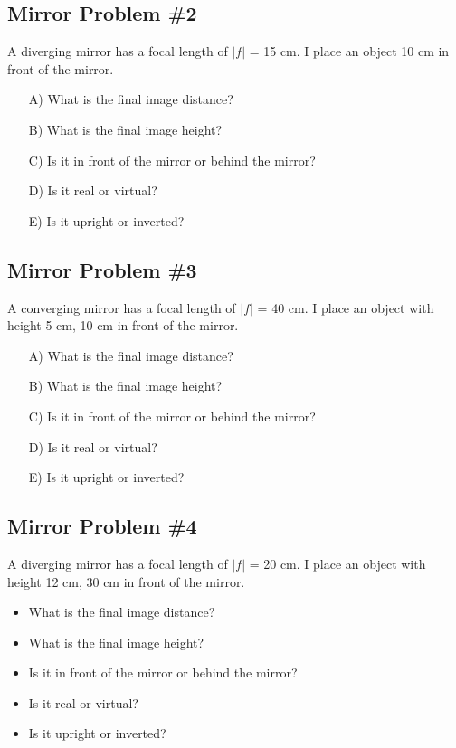 \documentclass[11pt]{article}
\begin{document}
\subsection{Mirror Problem \#2}
A diverging mirror has a focal length of $|f|$ = 15 cm.  I place an object 10 cm in front of the mirror.  

\begin{itemize}
\item[A)] What is the final image distance?
\item[B)] What is the final image height?
\item[C)] Is it in front of the mirror or behind the mirror?  
\item[D)] Is it real or virtual?
\item[E)] Is it upright or inverted?
\end{itemize}

\subsection{Mirror Problem \#3}
A converging mirror has a focal length of $|f|$ = 40 cm.  I place an object with height 5 cm, 10 cm in front of the mirror.  

\begin{itemize}
\item[A)] What is the final image distance?
\item[B)] What is the final image height?
\item[C)] Is it in front of the mirror or behind the mirror?  
\item[D)] Is it real or virtual?
\item[E)] Is it upright or inverted?
\end{itemize}

\subsection{Mirror Problem \#4}
A diverging mirror has a focal length of $|f|$ = 20 cm.  I place an object with height 12 cm, 30 cm in front of the mirror.  

\begin{itemize}
\item What is the final image distance?
\item What is the final image height?
\item Is it in front of the mirror or behind the mirror?  
\item Is it real or virtual?
\item Is it upright or inverted?
\end{itemize}
\end{document}
